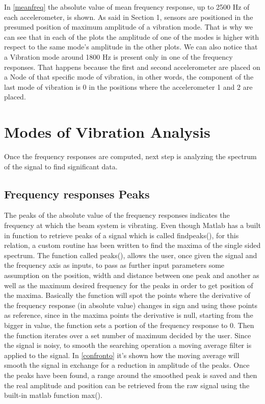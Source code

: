 \documentclass[12pt,a4paper,twoside]{article}
\begin{document}
In \figurename{ \ref{meanfreq}} the  absolute value of mean frequency response, up to 2500 Hz of each accelerometer, is shown. As said in Section 1, sensors are positioned in the presumed position of maximum amplitude of a vibration mode. That is why we can see that in each of the plots the amplitude of one of the modes is higher with respect to the same mode's amplitude in the other plots. We can also notice that a Vibration mode around 1800 Hz is present only in one of the frequency responses. That happens because the first and second accelerometer are placed on a Node of that specific mode of vibration, in other words, the component of the last mode of vibration is 0 in the positions where the accelerometer 1 and 2 are placed.



\bigskip \bigskip  

\section{Modes of Vibration Analysis}
Once the frequency responses are computed, next step is analyzing the spectrum of the signal to find significant data.
\subsection{Frequency responses Peaks}

The peaks of the absolute value of the frequency responses indicates the frequency at which the beam system is vibrating. Even though Matlab has a built in function to retrieve peaks of a signal which is called findpeaks(), for this relation, a custom routine has been written to find the maxima of the single sided spectrum. The function called peaks(), allows the user, once given the signal and the frequency axis as inputs, to pass as further input parameters some assumption on the position, width and distance between one peak and another as well as the maximum desired frequency for the peaks in order to get position of the maxima. Basically the function will spot the points where the derivative of the frequency response (in absolute value) changes in sign and using these points as reference, since in the maxima points the derivative is null, starting from the bigger in value, the function sets a portion of the frequency response to 0. Then the function iterates over a set number of maximum decided by the user. Since the signal is noisy,  to smooth the searching operation a moving average filter is applied to the signal. In \figurename{ \ref{confronto}} it's shown how the moving average will smooth the signal in exchange for a reduction in amplitude of the peaks. Once the peaks have been found, a range around the smoothed peak is saved and then the real amplitude and position can be retrieved from the raw signal using the built-in matlab function max().
\end{document}

